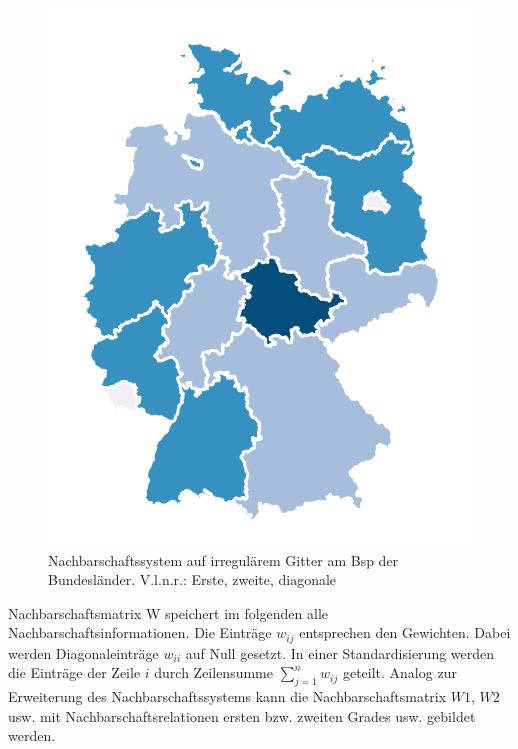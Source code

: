 \begin{figure}
\begin{minipage}[b]{.3\linewidth}
       \includegraphics[width=\linewidth,trim={1cm 1cm 1cm 1cm},clip]{body/figures/73-BL_nb_zd.pdf}
    \end{minipage}
    \caption[Nachbarschaftssysteme]{Nachbarschaftssystem auf irregulärem Gitter am Bsp der Bundesländer. 
    V.l.n.r.: Erste, zweite, diagonale}
    \label{fig_neighbours_bl}
 \end{figure}

Nachbarschaftsmatrix W speichert im folgenden alle Nachbarschaftsinformationen. 
Die Einträge $w_{ij}$ entsprechen den Gewichten. Dabei werden Diagonaleinträge $w_{ii}$ auf Null gesetzt. 
In einer Standardisierung werden die Einträge der Zeile $i$ durch Zeilensumme $\sum_{j=1}^{n} w_{ij}$ geteilt. 
Analog zur Erweiterung des Nachbarschaftssystems kann die Nachbarschaftsmatrix $W1$, $W2$ usw. 
mit Nachbarschaftsrelationen ersten bzw. zweiten Grades usw. gebildet werden.
